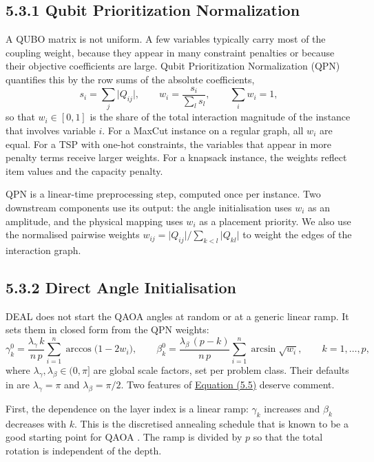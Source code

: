 \documentclass{report}
\theoremstyle{plain}
\theoremstyle{definition}
\theoremstyle{remark}
\begin{document}
\subsection{5.3.1 Qubit Prioritization Normalization}\label{sec:nisq:qpn}

A QUBO matrix is not uniform. A few variables typically carry most of the coupling weight, because they appear in many constraint penalties or because their objective coefficients are large. Qubit Prioritization Normalization (QPN) quantifies this by the row sums of the absolute coefficients,
\hypertarget{eq:nisq:qpn}{}\[
  s_{i} = \sum_{j} \lvert Q_{ij}\rvert, \qquad w_{i} = \frac{s_{i}}{\sum_{l} s_{l}}, \qquad \sum_{i} w_{i} = 1,
\tag{5.4}\]
so that $w_{i}\in[0,1]$ is the share of the total interaction magnitude of the instance that involves variable $i$. For a MaxCut instance on a regular graph, all $w_{i}$ are equal. For a TSP with one-hot constraints, the variables that appear in more penalty terms receive larger weights. For a knapsack instance, the weights reflect item values and the capacity penalty.

QPN is a linear-time preprocessing step, computed once per instance. Two downstream components use its output: the angle initialisation uses $w_{i}$ as an amplitude, and the physical mapping uses $w_{i}$ as a placement priority. We also use the normalised pairwise weights $w_{ij}=\lvert Q_{ij}\rvert/\sum_{k<l}\lvert Q_{kl}\rvert$ to weight the edges of the interaction graph.

\subsection{5.3.2 Direct Angle Initialisation}\label{sec:nisq:init}

DEAL does not start the QAOA angles at random or at a generic linear ramp. It sets them in closed form from the QPN weights:
\hypertarget{eq:nisq:init}{}\[
  \gamma_{k}^{0} = \frac{\lambda_{\gamma}\, k}{n\,p}\sum_{i=1}^{n} \arccos\bigl(1-2w_{i}\bigr),
  \qquad
  \beta_{k}^{0} = \frac{\lambda_{\beta}\,(p-k)}{n\,p}\sum_{i=1}^{n} \arcsin\sqrt{w_{i}},
  \qquad k=1,\dots,p,
\tag{5.5}\]
where $\lambda_{\gamma},\lambda_{\beta}\in(0,\pi]$ are global scale factors, set per problem class. Their defaults in \cite{guo2025deal} are $\lambda_{\gamma}=\pi$ and $\lambda_{\beta}=\pi/2$. Two features of \hyperref[eq:nisq:init]{Equation (5.5)} deserve comment.

First, the dependence on the layer index is a linear ramp: $\gamma_{k}$ increases and $\beta_{k}$ decreases with $k$. This is the discretised annealing schedule that is known to be a good starting point for QAOA \cite{weidenfeller2022qaoascaling,sachdeva2024qaoa127}. The ramp is divided by $p$ so that the total rotation is independent of the depth.
\end{document}
